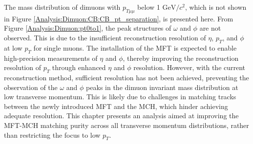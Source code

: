         The mass distribution of dimuons with \( p_{T\mu\mu} \) below 1 \( \mathrm{GeV}/c^2 \), which is not shown in Figure \ref{Analysis:Dimuon:CB:CB_pt_separation}, is presented here. From Figure \ref{Analysis:Dimuon:pt0to1}, the peak structures of \(\omega\) and \(\phi\) are not observed. This is due to the insufficient reconstruction resolution of \(\eta\), \( p_T \), and \(\phi\) at low \( p_T \) for single muons. The installation of the MFT is expected to enable high-precision measurements of \(\eta\) and \(\phi\), thereby improving the reconstruction resolution of \( p_T \) through enhanced \(\eta\) and \(\phi\) resolution. However, with the current reconstruction method, sufficient resolution has not been achieved, preventing the observation of the \(\omega\) and \(\phi\) peaks in the dimuon invariant mass distribution at low transverse momentum. This is likely due to challenges in matching tracks between the newly introduced MFT and the MCH, which hinder achieving adequate resolution. This chapter presents an analysis aimed at improving the MFT-MCH matching purity across all transverse momentum distributions, rather than restricting the focus to low \( p_T \).


